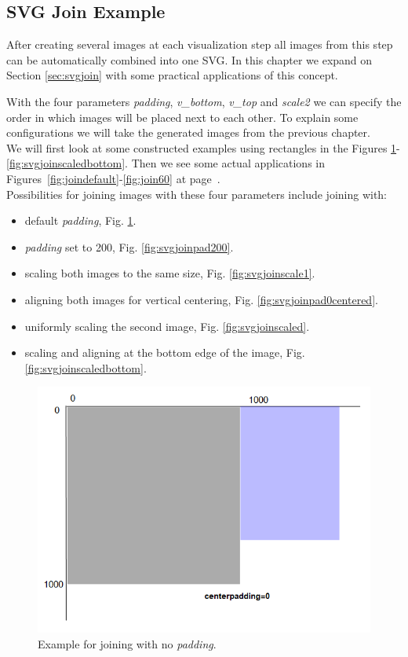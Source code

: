 \documentclass[a4paper, 12pt, bibliography=totoc]{scrartcl}
\begin{document}
\subsection{SVG Join Example}

After creating several images at each visualization step all images from this step can be automatically combined into one SVG. In this chapter we expand on Section \ref{sec:svgjoin} with some practical applications of this concept.

With the four parameters \textit{padding}, \textit{v\_bottom}, \textit{v\_top} and \textit{scale2} we can specify the order in which images will be placed next to each other. To explain some configurations we will take the generated images from the previous chapter.\\
\noindent
We will first look at some constructed examples using rectangles in the Figures \ref{fig:svgjoinpad0}-\ref{fig:svgjoinscaledbottom}. Then we see some actual applications in Figures~\ref{fig:joindefault}-\ref{fig:join60} at page~\pageref{fig:joindefault}.\noindent\\

\medskip\noindent
Possibilities for joining images with these four parameters include joining with:
\begin{itemize}[label=-, left=40pt]
	\item default \textit{padding}, Fig. \ref{fig:svgjoinpad0}.
	\item \textit{padding} set to 200, Fig. \ref{fig:svgjoinpad200}.
	\item scaling both images to the same size, Fig. \ref{fig:svgjoinscale1}.
	\item aligning both images for vertical centering, Fig. \ref{fig:svgjoinpad0centered}.
	\item uniformly scaling the second image, Fig. \ref{fig:svgjoinscaled}.
	\item scaling and aligning at the bottom edge of the image, Fig. \ref{fig:svgjoinscaledbottom}.
\end{itemize}

\begin{figure}[H]
	\centering
	\includegraphics[width=0.6\linewidth]{images/svgjoinpad0.png}
	\caption{Example for joining with no \textit{padding}.}
	\label{fig:svgjoinpad0}
\end{figure}
\end{document}
